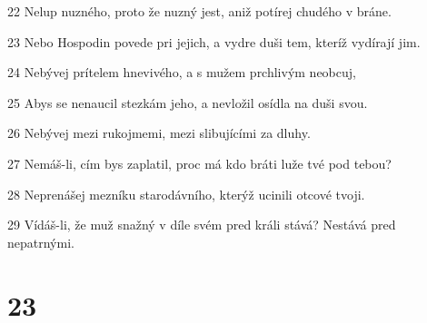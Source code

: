 \par 22 Nelup nuzného, proto že nuzný jest, aniž potírej chudého v bráne.
\par 23 Nebo Hospodin povede pri jejich, a vydre duši tem, kteríž vydírají jim.
\par 24 Nebývej prítelem hnevivého, a s mužem prchlivým neobcuj,
\par 25 Abys se nenaucil stezkám jeho, a nevložil osídla na duši svou.
\par 26 Nebývej mezi rukojmemi, mezi slibujícími za dluhy.
\par 27 Nemáš-li, cím bys zaplatil, proc má kdo bráti luže tvé pod tebou?
\par 28 Neprenášej mezníku starodávního, kterýž ucinili otcové tvoji.
\par 29 Vídáš-li, že muž snažný v díle svém pred králi stává? Nestává pred nepatrnými.

\chapter{23}

